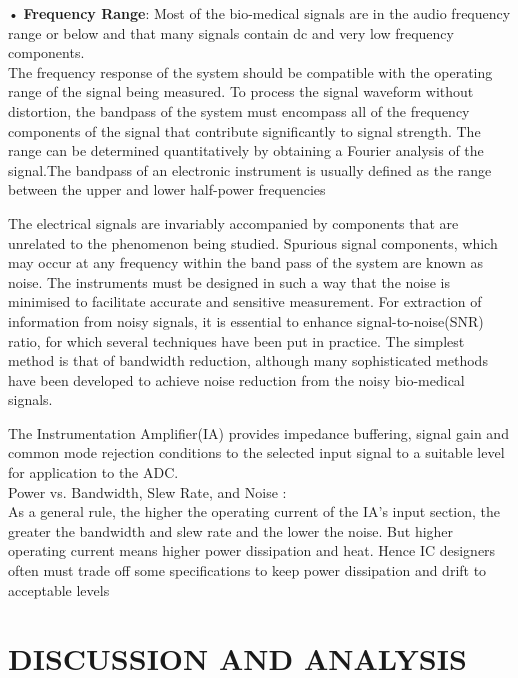 \documentclass[]{article}
\begin{document}
		•	\textbf{Frequency Range}: Most of the bio-medical signals are in the audio frequency range or below and that many signals contain dc and very low frequency components.\\
		
		The frequency response of the system should be compatible with the operating range of the signal being measured. To process the signal waveform without distortion, the bandpass of the system must encompass all of the frequency components of the signal that contribute significantly to signal strength. The range can be determined quantitatively by obtaining a Fourier analysis of the signal.The bandpass of an electronic instrument is usually defined as the range between the upper and lower half-power frequencies
		
		The electrical signals are invariably accompanied by components that are unrelated to the phenomenon being studied. Spurious signal components, which may occur at any frequency within the band pass of the system are known as noise.
		The instruments must be designed in such a way that the noise is minimised to facilitate accurate and sensitive measurement. For extraction of information from noisy signals, it is essential to enhance signal-to-noise(SNR) ratio, for which several techniques have been put in practice. The simplest method is that of bandwidth reduction, although many sophisticated methods have been developed to achieve noise reduction from the noisy bio-medical signals. \cite{khandpur2014}
		
		The Instrumentation Amplifier(IA) provides impedance buffering, signal gain and common mode rejection conditions to the selected input signal to a suitable level for application to the ADC.\\
		
		Power vs. Bandwidth, Slew Rate, and Noise :\\
		
			As a general rule, the higher the operating current of the IA's input section, the greater the bandwidth 
			and slew rate and the lower the noise. But higher operating 
			current means higher power dissipation and heat. Hence IC designers often must trade off some specifications to keep power dissipation and drift to acceptable levels
		
\section{DISCUSSION AND ANALYSIS}
\end{document}
